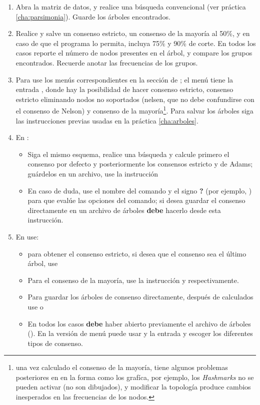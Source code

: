 \begin{enumerate}
\item  Abra la matriz de datos, y realice una b\'usqueda convencional (ver pr\'actica \ref{cha:parsimonia}). Guarde los \'arboles encontrados.

\item Realice y salve un consenso estricto, un consenso de la mayor\'ia al 50\%, y en caso de que el programa lo permita, incluya 75\% y 90\% de corte. En todos los casos reporte el n\'umero de nodos presentes en el \'arbol, y compare los grupos encontrados. Recuerde anotar las frecuencias de los grupos.

\item Para   use los men\'us correspondientes en la secci\'on de ; el men\'u  tiene la entrada , donde hay la posibilidad de hacer consenso estricto, consenso estricto eliminando nodos no soportados (nelsen, que no debe confundirse con el consenso de Nelson) y consenso de la mayor\'ia\footnote{una vez calculado el consenso de la mayor\'ia,  tiene algunos problemas posteriores en en la forma como los graf\'ica, por ejemplo, los \textit{Hashmarks} no se pueden activar (no son dibujados), y modificar la topolog\'ia produce cambios inesperados en las frecuencias de los nodos.}. Para salvar los \'arboles siga las instrucciones previas usadas en la pr\'actica \ref{cha:arboles}.

\item En :
	\begin{itemize}
	\item Siga el mismo esquema, realice una b\'usqueda y calcule primero el consenso por defecto y posteriormente los consensos estricto y de Adams; gu\'ardelos en un archivo, use la instrucci\'on 
	\item En caso de duda, use el nombre del comando y el signo \textbf{?} (por ejemplo, ) para que eval\'ue las opciones del comando; si desea guardar el consenso directamente en un archivo de \'arboles \textbf{debe} hacerlo desde esta instrucci\'on.
	\end{itemize}

\item En  use:
	\begin{itemize}
		\item {} para obtener el consenso estricto, si desea que el consenso sea el \'ultimo \'arbol, use 
		\item Para el consenso de la mayor\'ia, use la instrucci\'on  y  respectivamente. 
		\item Para guardar los \'arboles de consenso directamente, despu\'es de calculados use   o   
		\item En todos los casos \textbf{debe} haber abierto previamente el archivo de \'arboles (). En la versi\'on de men\'u puede usar  y la entrada  y escoger los diferentes tipos de consenso.
	\end{itemize}	


\end{enumerate}
